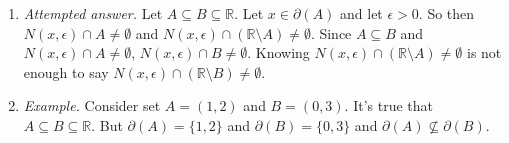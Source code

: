 \documentclass{article}
\theoremstyle{claim}
\theoremstyle{definition}
\begin{document}
\begin{enumerate}
    \item[] \emph{Attempted answer.} Let $A \subseteq B \subseteq \mathbb{R}$. Let $x \in \partial(A)$ and let $\epsilon > 0$. So then $N(x, \epsilon) \cap A \ne \emptyset$ and $N(x, \epsilon) \cap (\mathbb{R} \setminus A) \ne \emptyset$. Since $A \subseteq B$ and $N(x, \epsilon) \cap A \ne \emptyset$, $N(x, \epsilon) \cap B \ne \emptyset$. Knowing $N(x, \epsilon) \cap (\mathbb{R} \setminus A) \ne \emptyset$ is not enough to say $N(x, \epsilon) \cap (\mathbb{R} \setminus B) \ne \emptyset$.
    \item[] \emph{Example. } Consider set $A = (1, 2)$ and $B = (0, 3)$. It's true that $A \subseteq B \subseteq \mathbb{R}$. But $\partial(A) = \{ 1, 2 \}$ and $\partial(B) = \{0, 3\}$ and $\partial(A) \nsubseteq \partial(B)$.
\end{enumerate}
\end{document}
